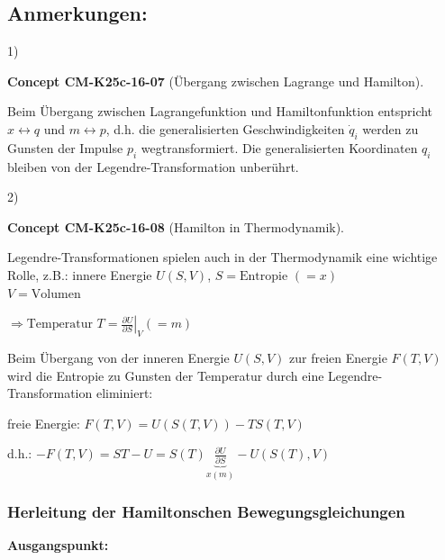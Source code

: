 \documentclass[10pt, letterpaper]{article}
\newcommand{\CustomHeading}[3]{%
  \par\medskip\noindent%
  \textbf{#1 #2} \textnormal{(#3)}.\enskip%
}
\newenvironment{CONC}[2]{\begin{unitbox}\CustomHeading{Concept}{#1}{#2}}{\end{unitbox}}
\begin{document}
\subsection*{Anmerkungen:}

1) 

\begin{CONC}{CM-K25c-16-07}{Übergang zwischen Lagrange und Hamilton}
Beim Übergang zwischen Lagrangefunktion und Hamiltonfunktion entspricht $x \leftrightarrow q$ und $m \leftrightarrow p$, d.h. die generalisierten Geschwindigkeiten $\dot{q}_i$ werden zu Gunsten der Impulse $p_i$ wegtransformiert. Die generalisierten Koordinaten $q_i$ bleiben von der Legendre-Transformation unberührt.
\end{CONC}

2) 


\begin{CONC}{CM-K25c-16-08}{Hamilton in Thermodynamik}
Legendre-Transformationen spielen auch in der Thermodynamik eine wichtige Rolle, z.B.:
innere Energie $U(S,V)$, $S = \text{Entropie } (=x)$\\
$V = \text{Volumen}$

$\Rightarrow \text{Temperatur } T = \left.\frac{\partial U}{\partial S}\right|_V (=m)$

Beim Übergang von der inneren Energie $U(S,V)$ zur freien Energie $F(T,V)$ wird die Entropie zu Gunsten der Temperatur durch eine Legendre-Transformation eliminiert:

freie Energie: $F(T,V) = U(S(T,V)) - TS(T,V)$

d.h.: $-F(T,V) = ST-U = S(T)\underbrace{\frac{\partial U}{\partial S}}_{x(m)} - U(S(T),V)$
\end{CONC}







\pagebreak


\subsubsection*{Herleitung der Hamiltonschen Bewegungsgleichungen}

\textbf{Ausgangspunkt:} 
\end{document}
